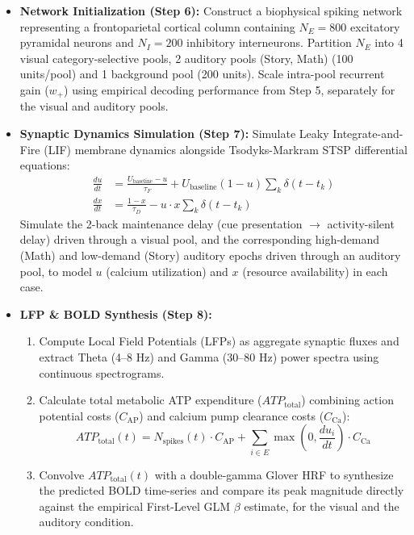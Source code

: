 \documentclass[11pt,a4paper]{article}
\begin{document}
\begin{itemize}
    \item \textbf{Network Initialization (Step 6):} Construct a biophysical spiking network representing a frontoparietal cortical column containing $N_E = 800$ excitatory pyramidal neurons and $N_I = 200$ inhibitory interneurons. Partition $N_E$ into 4 visual category-selective pools, 2 auditory pools (Story, Math) (100 units/pool) and 1 background pool (200 units). Scale intra-pool recurrent gain ($w_+$) using empirical decoding performance from Step 5, separately for the visual and auditory pools.
    \item \textbf{Synaptic Dynamics Simulation (Step 7):} Simulate Leaky Integrate-and-Fire (LIF) membrane dynamics alongside Tsodyks-Markram STSP differential equations:
    \begin{align}
        \frac{du}{dt} &= \frac{U_{\text{baseline}} - u}{\tau_F} + U_{\text{baseline}}(1 - u) \sum_k \delta(t - t_k) \\
        \frac{dx}{dt} &= \frac{1 - x}{\tau_D} - u \cdot x \sum_k \delta(t - t_k)
    \end{align}
    Simulate the 2-back maintenance delay (cue presentation $\rightarrow$ activity-silent delay) driven through a visual pool, and the corresponding high-demand (Math) and low-demand (Story) auditory epochs driven through an auditory pool, to model $u$ (calcium utilization) and $x$ (resource availability) in each case.
    \item \textbf{LFP \& BOLD Synthesis (Step 8):}
    \begin{enumerate}
        \item Compute Local Field Potentials (LFPs) as aggregate synaptic fluxes and extract Theta (4--8 Hz) and Gamma (30--80 Hz) power spectra using continuous spectrograms.
        \item Calculate total metabolic ATP expenditure ($ATP_{\text{total}}$) combining action potential costs ($C_{\text{AP}}$) and calcium pump clearance costs ($C_{\text{Ca}}$):
        \[
        ATP_{\text{total}}(t) = N_{\text{spikes}}(t) \cdot C_{\text{AP}} + \sum_{i \in E} \max\left(0, \frac{du_i}{dt}\right) \cdot C_{\text{Ca}}
        \]
        \item Convolve $ATP_{\text{total}}(t)$ with a double-gamma Glover HRF to synthesize the predicted BOLD time-series and compare its peak magnitude directly against the empirical First-Level GLM $\beta$ estimate, for the visual and the auditory condition.
    \end{enumerate}
\end{itemize}
\end{document}
